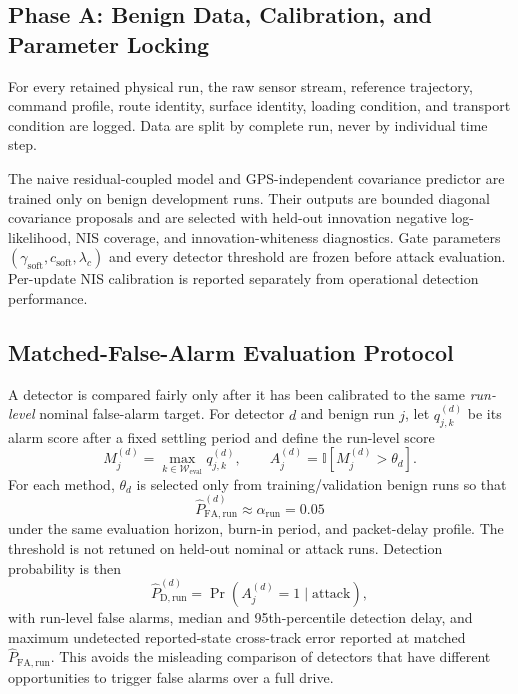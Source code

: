 \documentclass[11pt,a4paper]{article}
\begin{document}
\subsection{Phase A: Benign Data, Calibration, and Parameter Locking}
For every retained physical run, the raw sensor stream, reference trajectory,
command profile, route identity, surface identity, loading condition, and
transport condition are logged. Data are split by complete run, never by
individual time step.

The naive residual-coupled model and GPS-independent covariance predictor are trained only on benign development runs. Their outputs are bounded diagonal covariance proposals and are selected with held-out innovation negative log-likelihood, NIS coverage, and innovation-whiteness diagnostics. Gate parameters $(\gamma_{\mathrm{soft}},c_{\mathrm{soft}},\lambda_c)$ and every detector threshold are frozen before attack evaluation. Per-update NIS calibration is reported separately from operational detection performance.

\subsection{Matched-False-Alarm Evaluation Protocol}
A detector is compared fairly only after it has been calibrated to the same \emph{run-level} nominal false-alarm target. For detector $d$ and benign run $j$, let $q^{(d)}_{j,k}$ be its alarm score after a fixed settling period and define the run-level score
\begin{equation}
M^{(d)}_j=\max_{k\in\mathcal{W}_{\mathrm{eval}}}q^{(d)}_{j,k},
\qquad
A^{(d)}_j=\mathbb{I}[M^{(d)}_j>\theta_d].
\label{eq:run-level-alarm}
\end{equation}
For each method, $\theta_d$ is selected only from training/validation benign runs so that
\begin{equation}
\widehat{P}_{\mathrm{FA,run}}^{(d)}\approx\alpha_{\mathrm{run}}=0.05
\label{eq:matched-far}
\end{equation}
under the same evaluation horizon, burn-in period, and packet-delay profile. The threshold is not retuned on held-out nominal or attack runs. Detection probability is then
\begin{equation}
\widehat{P}_{\mathrm{D,run}}^{(d)}=\Pr(A^{(d)}_j=1\mid\text{attack}),
\end{equation}
with run-level false alarms, median and 95th-percentile detection delay, and maximum undetected reported-state cross-track error reported at matched $\widehat{P}_{\mathrm{FA,run}}$. This avoids the misleading comparison of detectors that have different opportunities to trigger false alarms over a full drive.
\end{document}

